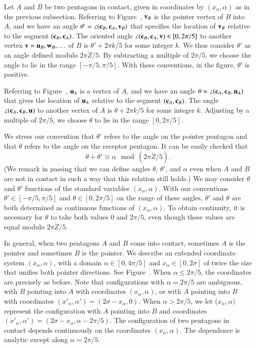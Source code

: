 Let $A$ and $B$ be two pentagons in contact, given in coordinates by
$(x_\alpha,\alpha)$ as in the previous subsection.  Referring to
Figure~, ${\mathbf v}_B$ is the pointer vertex of $B$ into $A$,
and we have an angle $\theta' = \angle({\mathbf c}_B,{\mathbf c}_A,{\mathbf v}_B)$ that specifies
the location of ${\mathbf v}_B$ relative to the segment $({\mathbf c}_B,{\mathbf c}_A)$.  The
oriented angle $\angle({\mathbf c}_B,{\mathbf c}_A,{\mathbf v})\in[0,2\pi/5]$ to another vertex
${\mathbf v}={\mathbf u}_B,{\mathbf w}_B,\ldots$ of $B$ is $\theta' + 2\pi k/5$ for some integer
$k$.  We thus consider $\theta'$ as an angle defined modulo
$2\pi\ring{Z}/5$.  By subtracting a multiple of $2\pi/5$, we choose
the angle to lie in the range $[-\pi/5,\pi/5]$.  With these
conventions, in the figure, $\theta'$ is positive.

Referring to Figure~, ${\mathbf u}_A$ is a vertex of $A$, and we
have an angle $\theta = \angle({\mathbf c}_A,{\mathbf c}_B,{\mathbf u}_A)$ that gives the
location of ${\mathbf u}_A$ relative to the segment $({\mathbf c}_A,{\mathbf c}_B)$.  The angle
$\angle({\mathbf c}_A,{\mathbf c}_B,{\mathbf u})$ to another vertex of $A$ is $\theta + 2\pi k/5$
for some integer $k$.  Adjusting by a multiple of $2\pi/5$, we choose
$\theta$ to lie in the range $[0,2\pi/5]$.

We stress our convention that $\theta'$ refers to the angle on the
pointer pentagon and that $\theta$ refers to the angle on the receptor
pentagon.  It can be easily checked that 
\begin{equation}
\theta+\theta' \equiv \alpha \mod (2\pi\ring{Z}/5).
\end{equation}
(We remark in passing that we can define angles $\theta$, $\theta'$,
and $\alpha$ even when $A$ and $B$ are not in contact in such a way
that this relation still holds.)  We may consider $\theta$ and
$\theta'$ functions of the standard variables $(x_\alpha,\alpha)$.  With
our conventions $\theta'\in [-\pi/5,\pi/5]$ and $\theta\in [0,2\pi/5]$
on the range of these angles, $\theta'$ and $\theta$ are both
determined as continuous functions of $(x_\alpha,\alpha)$.  To obtain
continuity, it is necessary for $\theta$ to take both values $0$ and
$2\pi/5$, even though these values are equal modulo $2\pi\ring{Z}/5$.

In general, when two pentagons $A$ and $B$ come into contact,
sometimes $A$ is the pointer and sometimes $B$ is the pointer.  We
describe an extended coordinate system $(x_\alpha,\alpha)$, with a
domain $\alpha\in[0,4\pi/5]$ and $x_\alpha\in[0,2\sigma]$ of twice the
size that unifies both pointer directions.  See
Figure~.  When $\alpha\le2\pi/5$, the coordinates are
precisely as before.  Note that configurations with $\alpha=2\pi/5$
are ambiguous, with $B$ pointing into $A$ with coordinates
$(x_\alpha,\alpha)$, or with $A$ pointing into $B$ with coordinates
$(x'_\alpha,\alpha')=(2\sigma - x_\alpha,0)$.  When $\alpha > 2\pi/5$, we
let ($x_\alpha,\alpha)$ represent the configuration with $A$ pointing
into $B$ and coordinates $(x'_\alpha,\alpha') =
(2\sigma-x_\alpha,\alpha-2\pi/5)$.  The configuration of two pentagons
in contact depends continuously on the coordinates $(x_\alpha,\alpha)$.
The dependence is analytic except along $\alpha=2\pi/5$.

